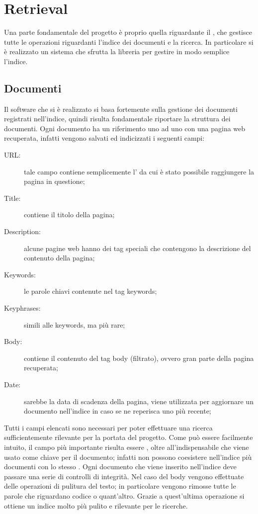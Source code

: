 \chapter{Retrieval}\label{cap:retrieval}
Una parte fondamentale del progetto è proprio quella riguardante il , che gestisce tutte le operazioni riguardanti l'indice dei documenti e la ricerca. In particolare si è realizzato un sistema che sfrutta la libreria  per gestire in modo semplice l'indice.
\section{Documenti}\label{cap:retrieval:docs}
Il software che si è realizzato si basa fortemente sulla gestione dei documenti registrati nell'indice, quindi risulta fondamentale riportare la struttura dei documenti.
Ogni documento ha un riferimento uno ad uno con una pagina web recuperata, infatti vengono salvati ed indicizzati i seguenti campi:
\begin{description}
\item[URL:] tale campo contiene semplicemente l' da cui è stato possibile raggiungere la pagina in questione;
\item[Title:] contiene il titolo della pagina;
\item[Description:] alcune pagine web hanno dei tag speciali che contengono la descrizione del contenuto della pagina;
\item[Keywords:] le parole chiavi contenute nel tag keywords;
\item[Keyphrases:] simili alle keywords, ma più rare;
\item[Body:] contiene il contenuto del tag body (filtrato), ovvero gran parte della pagina recuperata;
\item[Date:] sarebbe la data di scadenza della pagina, viene utilizzata per aggiornare un documento nell'indice in caso se ne reperisca uno più recente;
\end{description}
Tutti i campi elencati sono necessari per poter effettuare una ricerca sufficientemente rilevante per la portata del progetto. Come può essere facilmente intuito, il campo più importante risulta essere , oltre all'indispensabile  che viene usato come chiave per il documento; infatti non possono coesistere nell'indice più documenti con lo stesso .
Ogni documento che viene inserito nell'indice deve passare una serie di controlli di integrità. Nel caso del body vengono effettuate delle operazioni di pulitura del testo; in particolare vengono rimosse tutte le parole che riguardano codice o quant'altro. Grazie a quest'ultima operazione si ottiene un indice molto più pulito e rilevante per le ricerche.
